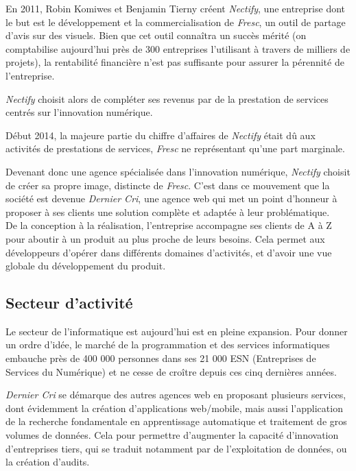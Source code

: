 \bigskip

En 2011, Robin Komiwes et Benjamin Tierny créent \emph{Nectify}, une
entreprise dont le but est le développement et la commercialisation de
\emph{Fresc}, un outil de partage d'avis sur des visuels. Bien que cet
outil connaîtra un succès mérité (on comptabilise aujourd'hui près de
300 entreprises l'utilisant à travers de milliers de projets), la
rentabilité financière n'est pas suffisante pour assurer la pérennité de
l'entreprise.

\bigskip

\emph{Nectify} choisit alors de compléter ses revenus par de la
prestation de services centrés sur l'innovation numérique.

\bigskip

Début 2014, la majeure partie du chiffre d'affaires de \emph{Nectify}
était dû aux activités de prestations de services, \emph{Fresc} ne
représentant qu'une part marginale.

\bigskip

Devenant donc une agence spécialisée dans l'innovation numérique,
\emph{Nectify} choisit de créer sa propre image, distincte de
\emph{Fresc}. C'est dans ce mouvement que la société est devenue
\emph{Dernier Cri}, une agence web qui met un point d'honneur à proposer
à ses clients une solution complète et adaptée à leur problématique.\\
De la conception à la réalisation, l'entreprise accompagne ses clients
de A à Z pour aboutir à un produit au plus proche de leurs besoins. Cela
permet aux développeurs d'opérer dans différents domaines d'activités,
et d'avoir une vue globale du développement du produit.

\bigskip

\subsection{Secteur d'activité}\label{secteur-dactivituxe9}

\bigskip

Le secteur de l'informatique est aujourd'hui est en pleine expansion.
Pour donner un ordre d'idée, le marché de la programmation et des
services informatiques embauche près de 400 000 personnes dans ses 21
000 ESN (Entreprises de Services du Numérique) et ne cesse de croître
depuis ces cinq dernières années.

\bigskip

\emph{Dernier Cri} se démarque des autres agences web en proposant
plusieurs services, dont évidemment la création d'applications
web/mobile, mais aussi l'application de la recherche fondamentale en
apprentissage automatique et traitement de gros volumes de données. Cela
pour permettre d'augmenter la capacité d'innovation d'entreprises tiers,
qui se traduit notamment par de l'exploitation de données, ou la
création d'audits.

